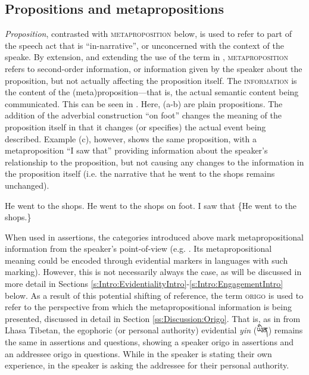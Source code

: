 \subsection{Propositions and metapropositions}
\textit{Proposition}, contrasted with \textsc{metaproposition} below, is used to refer to part of the speech act that is ``in-narrative'', or unconcerned with the context of the speake. By extension, and extending the use of the term in , \textsc{metaproposition} refers to second-order information, or information given by the speaker about the proposition, but not actually affecting the proposition itself. The \textsc{information} is the content of the (meta)proposition---that is, the actual semantic content being communicated. This can be seen in . Here, (a-b) are plain propositions. The addition of the adverbial construction ``on foot'' changes the meaning of the proposition itself in that it changes (or specifies) the actual event being described. Example (c), however, shows the same proposition, with a metaproposition ``I saw that'' providing information about the speaker's relationship to the proposition, but not causing any changes to the information in the proposition itself (i.e. the narrative that he went to the shops remains unchanged).

\begin{exe}
\ex\label{ex:MetapropEnglish}
\begin{xlist}
\ex He went to the shops.
\ex He went to the shops on foot.
\ex I saw that \{He went to the shops.\}\label{ex:MetapropEnglish:c}
\end{xlist}
\end{exe}

When used in assertions, the categories introduced above mark metapropositional information from the speaker's point-of-view (e.g. . Its metapropositional meaning could be encoded through evidential markers in languages with such marking). However, this is not necessarily always the case, as will be discussed in more detail in Sections \ref{s:Intro:EvidentialityIntro}-\ref{s:Intro:EngagementIntro} below. As a result of this potential shifting of reference, the term \textsc{origo} is used to refer to the perspective from which the metapropositional information is being presented, discussed in detail in Section \ref{ss:Discussion:Origo}. That is, as in  from Lhasa Tibetan, the egophoric (or personal authority) evidential \textit{yin} (\foreignlanguage{tibetan}{ཡིན}) remains the same in assertions and questions, showing a speaker origo in assertions and an addressee origo in questions. While in  the speaker is stating their own experience, in  the speaker is asking the addressee for their personal authority.

